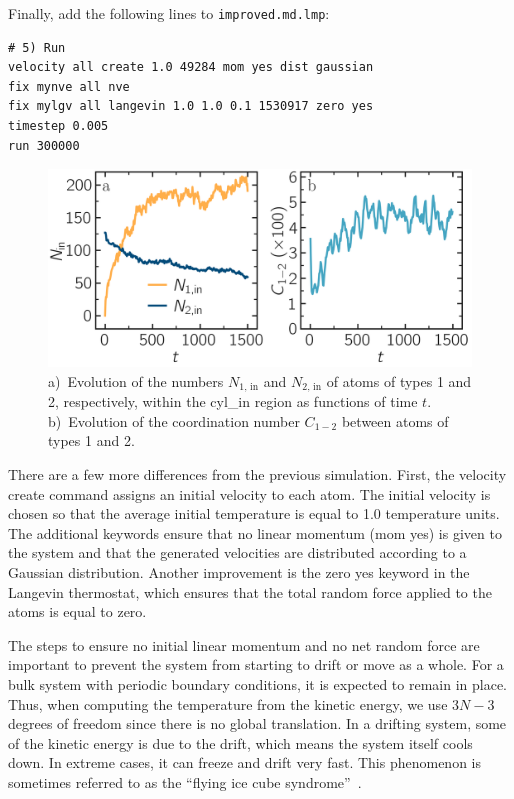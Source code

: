 \documentclass[9pt,tutorial]{livecoms}
\newcommand{\lmpcmd}[1]{\hspace{0pt}\colorbox{listing}{\textcolor{command}{\small{#1}}}\hspace{0pt}} %
\newcommand{\flecmd}[1]{\textcolor{command}{\texttt{#1}}} %
\begin{document}
Finally, add the following lines to \flecmd{improved.md.lmp}:
\begin{lstlisting}
# 5) Run
velocity all create 1.0 49284 mom yes dist gaussian
fix mynve all nve
fix mylgv all langevin 1.0 1.0 0.1 1530917 zero yes
timestep 0.005
run 300000
\end{lstlisting}

\begin{figure}
\centering
\includegraphics[width=\linewidth]{LJ-mixing}
\caption{a)~Evolution of the numbers $N_\text{1, in}$ and $N_\text{2, in}$ of atoms
of types 1 and 2, respectively, within the \lmpcmd{cyl\_in} region as functions
of time $t$.  b)~Evolution of the coordination number $C_{1-2}$ between atoms of types 1 and 2.}
\label{fig:mixing}
\end{figure}

There are a few more differences from the previous simulation.  First,
the \lmpcmd{velocity create} command assigns an initial velocity to each
atom.  The initial velocity is chosen so that the average initial
temperature is equal to 1.0 temperature units.  The additional keywords
ensure that no linear momentum (\lmpcmd{mom yes}) is given to the
system and that the generated velocities are distributed according to
a Gaussian distribution.  Another improvement is the \lmpcmd{zero yes}
keyword in the Langevin thermostat, which ensures that the total random
force applied to the atoms is equal to zero.

\begin{note}
The steps to ensure no initial linear momentum and no net random
force are important to prevent the system from starting to drift or move as a
whole.  For a bulk system with periodic boundary conditions, it is
expected to remain in place.  Thus, when computing the temperature from the
kinetic energy, we use $3N-3$ degrees of freedom since there is no
global translation.  In a drifting system, some of the kinetic energy is
due to the drift, which means the system itself cools down.  In
extreme cases, it can freeze and drift very fast.  This phenomenon is
sometimes referred to as the ``flying ice cube syndrome''~\cite{wong2016good}.
\end{note}
\end{document}
